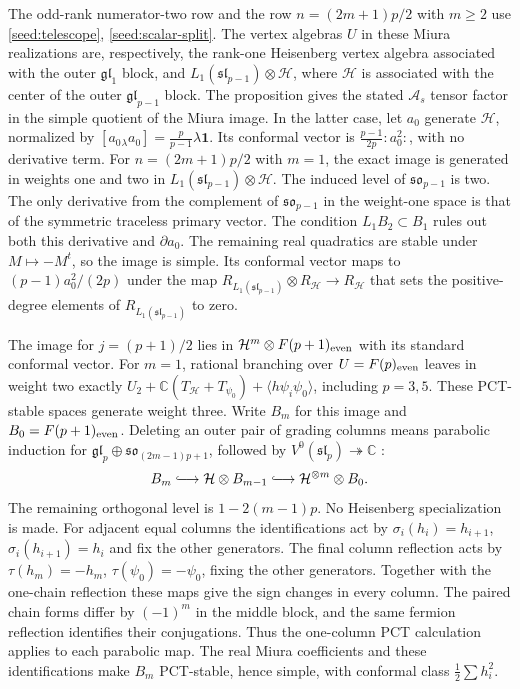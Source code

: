\documentclass[11pt,a4paper]{amsart}
\numberwithin{equation}{section}
\theoremstyle{definition}
\theoremstyle{remark}
\newcommand{\C}{\mathbb C}
\newcommand{\sog}{\mathfrak{so}}
\newcommand{\slg}{\mathfrak{sl}}
\newcommand{\glg}{\mathfrak{gl}}
\begin{document}
The odd-rank numerator-two row and the row $n=(2m+1)p/2$ with $m\ge2$ use
\cref{seed:telescope}, \cref{seed:scalar-split}. The vertex algebras $U$
in these Miura realizations are, respectively, the rank-one Heisenberg vertex algebra associated with the outer
$\glg_1$ block, and $L_1(\slg_{p-1})\otimes\mathcal H$, where
$\mathcal H$ is associated with the center of the outer $\glg_{p-1}$ block. The proposition
gives the stated $\mathcal A_s$ tensor factor in the simple quotient
of the Miura image.
In the latter case, let $a_0$ generate $\mathcal H$, normalized by
$[a_0{}_{\lambda}a_0]=\frac{p}{p-1}\lambda\mathbf1$. Its conformal
vector is $\frac{p-1}{2p}:a_0^2:$, with no derivative term.
For $n=(2m+1)p/2$ with $m=1$, the exact image is generated in weights
one and two in $L_1(\slg_{p-1})\otimes\mathcal H$.
The induced level of $\sog_{p-1}$ is two. The only derivative
from the complement of $\sog_{p-1}$ in the weight-one space
is that of the symmetric traceless primary vector. The condition $L_1B_2\subset B_1$ rules out
both this derivative and $\partial a_0$. The remaining real quadratics
are stable under $M\mapsto-M^t$, so the image is simple. Its conformal vector
maps to $(p-1)a_0^2/(2p)$ under the map
$R_{L_1(\slg_{p-1})}\otimes R_{\mathcal H}\to R_{\mathcal H}$
that sets the positive-degree elements of $R_{L_1(\slg_{p-1})}$ to zero.

The image for $j=(p+1)/2$ lies in $\mathcal H^m\otimes F(p+1)_{\rm even}$
with its standard conformal vector. For $m=1$, rational branching over
$U=F(p)_{\rm even}$ leaves in weight two exactly
$U_2+\C(T_{\mathcal H}+T_{\psi_0})+\langle h\psi_i\psi_0\rangle$,
including $p=3,5$. These PCT-stable spaces generate weight three.
Write $B_m$ for this image and $B_0=F(p+1)_{\rm even}$.
Deleting an outer pair of grading columns means parabolic induction
for $\glg_p\oplus\sog_{(2m-1)p+1}$, followed by
$V^0(\slg_p)\twoheadrightarrow\C$ \cite[Theorem~5.10]{Genra}:
$$
 B_m\lhook\joinrel\longrightarrow\mathcal H\otimes B_{m-1}
 \lhook\joinrel\longrightarrow\mathcal H^{\otimes m}\otimes B_0.
$$
The remaining orthogonal level is $1-2(m-1)p$. No Heisenberg
specialization is made. For adjacent equal columns the identifications
act by $\sigma_i(h_i)=h_{i+1}$, $\sigma_i(h_{i+1})=h_i$ and fix
the other generators. The final column reflection acts by
$\tau(h_m)=-h_m$, $\tau(\psi_0)=-\psi_0$, fixing the other generators.
Together with the one-chain reflection these maps give the sign changes
in every column. The paired chain forms differ by $(-1)^m$ in the
middle block, and the same fermion reflection identifies their conjugations.
Thus the one-column PCT calculation applies to each parabolic map.
The real Miura coefficients and these identifications make $B_m$
PCT-stable, hence simple, with conformal class $\frac12\sum h_i^2$.
\end{document}
